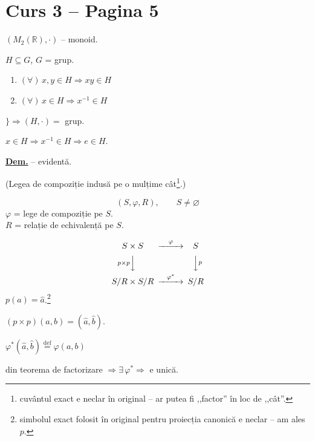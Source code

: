 \documentclass[12pt]{article}
\begin{document}
\section*{Curs 3 -- Pagina 5}

\noindent $(M_2(\mathbb{R}),\cdot)$ -- monoid.

\noindent $H\subseteq G$, $G$ = grup.

\begin{enumerate}
\item[1)] $(\forall)\, x,y\in H \Rightarrow xy\in H$
\item[2)] $(\forall)\, x\in H \Rightarrow x^{-1}\in H$
\end{enumerate}
\hspace{1cm}$\Bigg\} \Rightarrow (H,\cdot) = $ grup.

\noindent $x\in H \Rightarrow x^{-1}\in H \Rightarrow e\in H$.

\bigskip
\noindent\underline{\textbf{Dem.}} -- evidentă.

\bigskip
\noindent (Legea de compoziție indusă pe o mulțime cât\footnote{cuvântul exact e neclar în original -- ar putea fi ,,factor'' în loc de ,,cât''.}.)

\[
(S,\varphi,R), \qquad S\neq\varnothing
\]
\noindent $\varphi$ = lege de compoziție pe $S$.\\
$R$ = relație de echivalență pe $S$.

\[
\begin{CD}
S\times S @>\varphi>> S\\
@V{p\times p}VV @VV{p}V\\
S/R\times S/R @>\varphi^*>> S/R
\end{CD}
\]
\noindent $p(a) = \hat a$.\footnote{simbolul exact folosit în original pentru proiecția canonică e neclar -- am ales $p$.}

\noindent $(p\times p)(a,b) = (\hat a,\hat b)$.

\noindent $\varphi^*(\hat a,\hat b) \overset{\text{def}}{=} \varphi(a,b)$

\noindent din teorema de factorizare $\Rightarrow \exists\, \varphi^* \Rightarrow$ e unică.

\begin{center}
\end{center}
\end{document}
